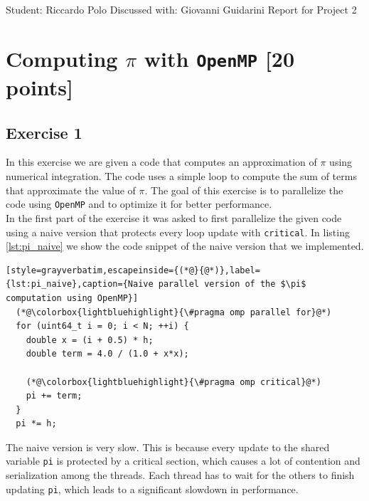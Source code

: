 \documentclass[unicode,10pt,a4paper,oneside,numbers=endperiod,openany]{scrartcl}
\begin{document}
\setassignment
{}

            {Student: Riccardo Polo}
            {Discussed with: Giovanni Guidarini}
            {Report for Project 2}{}
\newline

\assignmentpolicy

\newpage
\section{Computing $\pi$ with \texttt{OpenMP} [20 points]}
\subsection{Exercise 1}
In this exercise we are given a code that computes an approximation of $\pi$ using numerical integration. The code uses a simple loop to compute the sum of terms that approximate the value of $\pi$. The goal of this exercise is to parallelize the code using \texttt{OpenMP} and to optimize it for better performance.\\

In the first part of the exercise it was asked to first parallelize the given code using a naive version that protects every loop update with \texttt{critical}. In listing \ref{lst:pi_naive} we show the code snippet of the naive version that we implemented.
\begin{lstlisting}[style=grayverbatim,escapeinside={(*@}{@*)},label={lst:pi_naive},caption={Naive parallel version of the $\pi$ computation using OpenMP}]
  (*@\colorbox{lightbluehighlight}{\#pragma omp parallel for}@*)
  for (uint64_t i = 0; i < N; ++i) {
    double x = (i + 0.5) * h;
    double term = 4.0 / (1.0 + x*x);

    (*@\colorbox{lightbluehighlight}{\#pragma omp critical}@*)
    pi += term;
  }
  pi *= h;
  \end{lstlisting}
The naive version is very slow. This is because every update to the shared variable \texttt{pi} is protected by a critical section, which causes a lot of contention and serialization among the threads. Each thread has to wait for the others to finish updating \texttt{pi}, which leads to a significant slowdown in performance.\\
\end{document}

